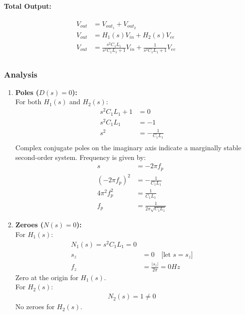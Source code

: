 \paragraph{Total Output:}
\begin{align*}
  V_{out} &= V_{out_1} + V_{out_2} \\
  V_{out} &= H_1(s)V_{in} + H_2(s)V_{ee} \\
  V_{out} &= \frac{s^2C_1L_1}{s^2C_1L_1 + 1}V_{in} + \frac{1}{s^2C_1L_1 + 1}V_{ee} \\
\end{align*}

\subsubsection{Analysis}
\begin{enumerate}
  \item \textbf{Poles (\(D(s) = 0\)):} \\
    For both \(H_1(s)\) and \(H_2(s)\):
    \begin{align*}
      s^2C_1L_1 + 1 &= 0 \\
      s^2C_1L_1 &= -1 \\
      s^2 &= -\frac{1}{C_1L_1} \\
    \end{align*}
    Complex conjugate poles on the imaginary axis indicate
    a marginally stable second-order system. Frequency is given
    by:
    \begin{align*}
      s &= -2 \pi f_p \\
      (-2 \pi f_p)^2 &= -\frac{1}{C_1L_1} \\
      4 \pi^2 f_p^2 &= \frac{1}{C_1L_1} \\
      f_p &= \frac{1}{2 \pi \sqrt{C_1L_1}}
    \end{align*}
  \item \textbf{Zeroes (\(N(s) = 0\)):} \\
    For \(H_1(s)\):
    \begin{align*}
        N_1(s) = s^2C_1L_1 = 0 \\
        s_z &= 0 \quad \text{[let \(s = s_z\)]} \\
        f_z &= \frac{|s_z|}{2\pi} = 0 Hz
    \end{align*}
    Zero at the origin for \(H_1(s)\). \\
    For \(H_2(s)\):
    \begin{align*}
        N_2(s) = 1 \neq 0
    \end{align*}
    No zeroes for \(H_2(s)\).

\end{enumerate}
